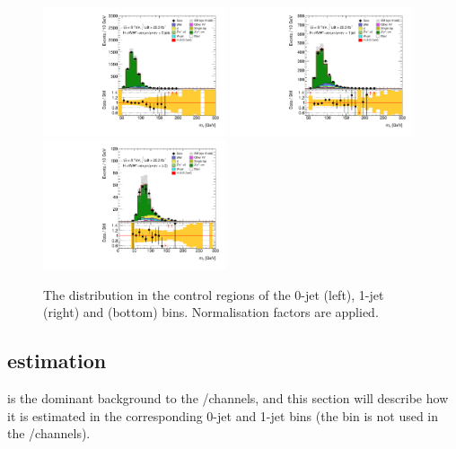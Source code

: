 \begin{figure}[t]
	\includegraphics[width=0.48\textwidth]{tex/backgrounds/emme_CutZttControl_0jet_MT_TrackHWW_Clj_mh125_lin}
	\hfill
	\includegraphics[width=0.48\textwidth]{tex/backgrounds/emme_CutZttControl_1jet_MT_TrackHWW_Clj_mh125_lin}
	\\
	\includegraphics[width=0.48\textwidth]{tex/backgrounds/emme_CutFailVBFZttCR_2jetincl_MT_TrackHWW_Clj_mh125_lin}
	\caption{The \mt distribution in the \DYtt control regions of the 0-jet (left), 1-jet 
	(right) and \twojet (bottom) bins. Normalisation factors are applied.}
	\label{fig:dytt:cr}
\end{figure}



\clearpage
\subsection{\DYll estimation}
\label{sec:dy:ll}

\DYll is the dominant background to the \eech/\mmch channels, and this section will 
describe how it is estimated in the corresponding 0-jet and 1-jet bins (the \twojet bin 
is not used in the \eech/\mmch channels).

